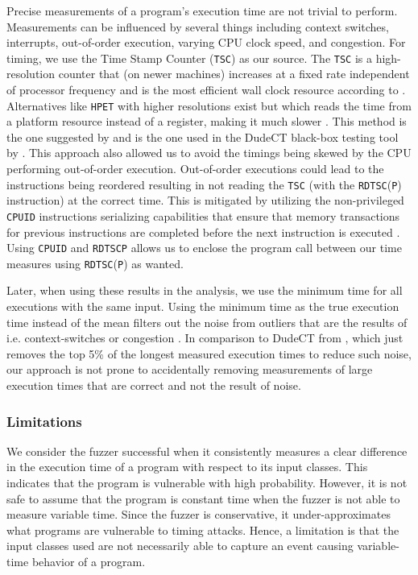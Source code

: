 Precise measurements of a program's execution time are not trivial to perform. 
Measurements can be influenced by several things including context switches, interrupts, out-of-order execution, varying CPU clock speed, and congestion. 
For timing, we use the Time Stamp Counter (\texttt{TSC}) as our source.
The \texttt{TSC} is a high-resolution counter that (on newer machines) increases at a fixed rate independent of processor frequency and is the most efficient wall clock resource according to \citep[b]{intel-reference}.
Alternatives like \texttt{HPET} with higher resolutions exist but which reads the time from a platform resource instead of a register, making it much slower \citep[b]{intel-reference}.
This method is the one suggested by \citep{intel-benchmark-code-execution} and is the one used in the DudeCT black-box testing tool by \citep{dudect}.
This approach also allowed us to avoid the timings being skewed by the CPU performing out-of-order execution.
Out-of-order executions could lead to the instructions being reordered resulting in not reading the \texttt{TSC} (with the \texttt{RDTSC}(\texttt{P}) instruction) at the correct time. 
This is mitigated by utilizing the non-privileged \texttt{CPUID} instructions serializing capabilities that ensure that memory transactions for previous instructions are completed before the next instruction is executed \citep[a]{intel-reference}.
Using \texttt{CPUID} and \texttt{RDTSCP} allows us to enclose the program call between our time measures using \texttt{RDTSC}(\texttt{P}) as wanted.



Later, when using these results in the analysis, we use the minimum time for all executions with the same input.
Using the minimum time as the true execution time instead of the mean filters out the noise from outliers that are the results of i.e. context-switches or congestion \citep{robust-benchmarking}. 
In comparison to DudeCT from \citep{dudect}, which just removes the top 5\% of the longest measured execution times to reduce such noise, our approach is not prone to accidentally removing measurements of large execution times that are correct and not the result of noise.

\subsubsection{Limitations}
We consider the fuzzer successful when it consistently measures a clear difference in the execution time of a program with respect to its input classes.
This indicates that the program is vulnerable with high probability.
However, it is not safe to assume that the program is constant time when the fuzzer is not able to measure variable time.
Since the fuzzer is conservative, it under-approximates what programs are vulnerable to timing attacks.
Hence, a limitation is that the input classes used are not necessarily able to capture an event causing variable-time behavior of a program.

